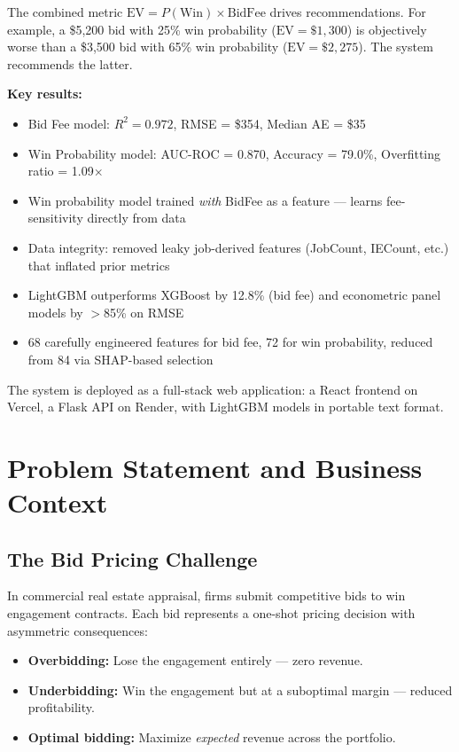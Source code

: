 \documentclass[12pt,a4paper]{article}
\begin{document}
The combined metric $\text{EV} = P(\text{Win}) \times \text{BidFee}$ drives recommendations. For example, a \$5,200 bid with 25\% win probability ($\text{EV} = \$1{,}300$) is objectively worse than a \$3,500 bid with 65\% win probability ($\text{EV} = \$2{,}275$). The system recommends the latter.

\textbf{Key results:}
\begin{itemize}[nosep]
    \item Bid Fee model: $R^2 = 0.972$, RMSE = \$354, Median AE = \$35
    \item Win Probability model: AUC-ROC = 0.870, Accuracy = 79.0\%, Overfitting ratio = 1.09$\times$
    \item Win probability model trained \emph{with} BidFee as a feature --- learns fee-sensitivity directly from data
    \item Data integrity: removed leaky job-derived features (JobCount, IECount, etc.) that inflated prior metrics
    \item LightGBM outperforms XGBoost by 12.8\% (bid fee) and econometric panel models by $>$85\% on RMSE
    \item 68 carefully engineered features for bid fee, 72 for win probability, reduced from 84 via SHAP-based selection
\end{itemize}

The system is deployed as a full-stack web application: a React frontend on Vercel, a Flask API on Render, with LightGBM models in portable text format.

\section{Problem Statement and Business Context}

\subsection{The Bid Pricing Challenge}

In commercial real estate appraisal, firms submit competitive bids to win engagement contracts. Each bid represents a one-shot pricing decision with asymmetric consequences:

\begin{itemize}[nosep]
    \item \textbf{Overbidding:} Lose the engagement entirely --- zero revenue.
    \item \textbf{Underbidding:} Win the engagement but at a suboptimal margin --- reduced profitability.
    \item \textbf{Optimal bidding:} Maximize \emph{expected} revenue across the portfolio.
\end{itemize}
\end{document}
